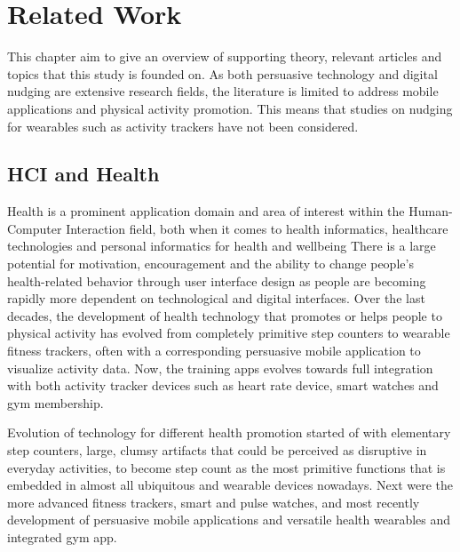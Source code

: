 \chapter{Related Work}

This chapter aim to give an overview of supporting theory, relevant articles and topics that this study is founded on. As both persuasive technology and digital nudging are extensive research fields, the literature is limited to address mobile applications and physical activity promotion. This means that studies on nudging for wearables such as activity trackers have not been considered.

\section{HCI and Health}
Health is a prominent application domain and area of interest within the Human-Computer Interaction field, both when it comes to health informatics, healthcare technologies and personal informatics for health and wellbeing 
\cite{wilson_human-computer_2015}
There is a large potential for motivation, encouragement and the ability to change people’s health-related behavior through user interface design as people are becoming rapidly more dependent on technological and digital interfaces. Over the last decades, the development of health technology that promotes or helps people to physical activity has evolved from completely primitive step counters to wearable fitness trackers, often with a corresponding persuasive mobile application to visualize activity data. Now, the training apps evolves towards full integration with both activity tracker devices such as heart rate device, smart watches and gym membership. 

Evolution of technology for different health promotion started of with elementary step counters, large, clumsy artifacts that could be perceived as disruptive in everyday activities, to become step count as the most primitive functions that is embedded in almost all ubiquitous and wearable devices nowadays. Next were the more advanced fitness trackers, smart and pulse watches, and most recently development of persuasive mobile applications and versatile health wearables and integrated gym app.

